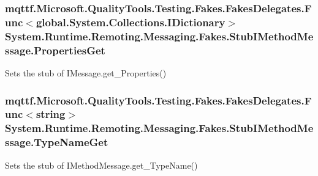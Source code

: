 \hypertarget{class_system_1_1_runtime_1_1_remoting_1_1_messaging_1_1_fakes_1_1_stub_i_method_message_aa14614046721212f8d0c11015be69652}{
\subsubsection[{Properties\-Get}]{\setlength{\rightskip}{0pt plus 5cm}mqttf.\-Microsoft.\-Quality\-Tools.\-Testing.\-Fakes.\-Fakes\-Delegates.\-Func$<$global.\-System.\-Collections.\-I\-Dictionary$>$ System.\-Runtime.\-Remoting.\-Messaging.\-Fakes.\-Stub\-I\-Method\-Message.\-Properties\-Get}}\label{class_system_1_1_runtime_1_1_remoting_1_1_messaging_1_1_fakes_1_1_stub_i_method_message_aa14614046721212f8d0c11015be69652}


Sets the stub of I\-Message.\-get\-\_\-\-Properties()

\hypertarget{class_system_1_1_runtime_1_1_remoting_1_1_messaging_1_1_fakes_1_1_stub_i_method_message_a4dba9db71a2fb83b0bd4d0f7cdf80f66}{
\subsubsection[{Type\-Name\-Get}]{\setlength{\rightskip}{0pt plus 5cm}mqttf.\-Microsoft.\-Quality\-Tools.\-Testing.\-Fakes.\-Fakes\-Delegates.\-Func$<$string$>$ System.\-Runtime.\-Remoting.\-Messaging.\-Fakes.\-Stub\-I\-Method\-Message.\-Type\-Name\-Get}}\label{class_system_1_1_runtime_1_1_remoting_1_1_messaging_1_1_fakes_1_1_stub_i_method_message_a4dba9db71a2fb83b0bd4d0f7cdf80f66}


Sets the stub of I\-Method\-Message.\-get\-\_\-\-Type\-Name()

